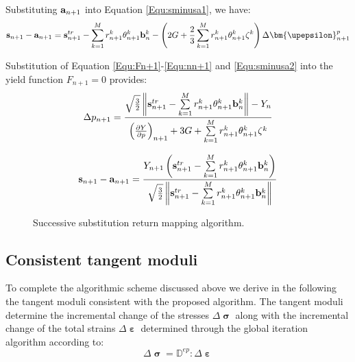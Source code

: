 Substituting ${{\bf{a}}_{n + 1}}$ into Equation \ref{Equ:sminusa1}, we have:
\begin{equation}
\label{Equ:sminusa2}
\begin{aligned}
{{{\bf{s}}_{n + 1}} - {{\bf{a}}_{n + 1}}}=
{\bf{s}}_{n + 1}^{tr} - \sum\limits_{k = 1}^M {r_{n + 1}^k\theta _{n + 1}^k{\bf{b}}_n^k}
- \left( {2G + \frac{2}{3}\sum\limits_{k = 1}^M {r_{n + 1}^k\theta _{n + 1}^k{\zeta ^k}} } \right)\Delta {\bm{\upepsilon }}_{n + 1}^p
\end{aligned}
\end{equation}

Substitution of Equation \ref{Equ:Fn+1}-\ref{Equ:nn+1} and \ref{Equ:sminusa2} into the yield function ${F_{n + 1}} = 0$ provides:
\begin{equation}
\Delta {p_{n + 1}} = \frac{{\sqrt {\frac{3}{2}} \left\| {{\bf{s}}_{n + 1}^{tr} - \sum\limits_{k = 1}^M {r_{n + 1}^k\theta _{n + 1}^k{\bf{b}}_n^k} } \right\| - {Y_n}}}{{{{\left( {\frac{{\partial Y}}{{\partial p}}} \right)}_{n + 1}} + 3G + \sum\limits_{k = 1}^M {r_{n + 1}^k\theta _{n + 1}^k{\zeta ^k}} }}
\end{equation}

\begin{equation}
{{\bf{s}}_{n + 1}} - {{\bf{a}}_{n + 1}} = \frac{{{Y_{n + 1}}\left( {{\bf{s}}_{n + 1}^{tr} - \sum\limits_{k = 1}^M {r_{n + 1}^k\theta _{n + 1}^k{\bf{b}}_n^k} } \right)}}{{\sqrt {\frac{3}{2}} \left\| {{\bf{s}}_{n + 1}^{tr} - \sum\limits_{k = 1}^M {r_{n + 1}^k\theta _{n + 1}^k{\bf{b}}_n^k} } \right\|}}
\end{equation}
\begin{figure}[!htp]
\centering{}
\caption{Successive substitution return mapping algorithm.}
\label{Fig:radial_return_map}
\end{figure}

\subsection{Consistent tangent moduli}
To complete the algorithmic scheme discussed above we derive in the following the tangent moduli consistent with the proposed algorithm. The tangent moduli determine the incremental change of the stresses $\Delta {\bm{\upsigma }}$ along with the incremental change of the total strains $\Delta {\bm{\upepsilon }}$ determined through the global iteration algorithm according to:
\begin{equation}
\Delta {\bm{\upsigma }} = {\mathbb{D}^{ep}}:\Delta {\bm{\upepsilon }}
\end{equation}

